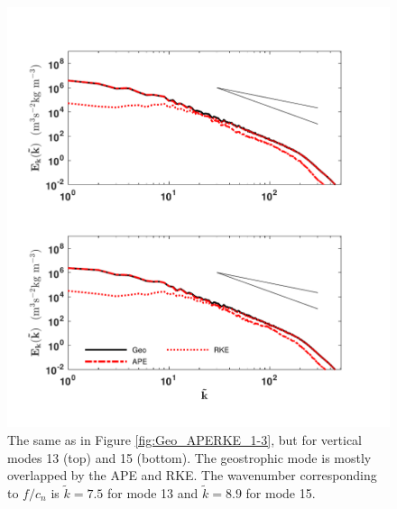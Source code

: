 \begin{figure}[H]
\includegraphics[scale=1]{Chapter4/img/Geo_APERKE_13-15}
\caption{The same as in Figure \ref{fig:Geo_APERKE_1-3}, but for vertical modes 13 (top) and 15 (bottom). The geostrophic mode is mostly overlapped by the APE and RKE. The wavenumber corresponding to $f/c_n$ is $\tilde{k} = 7.5$ for mode 13 and $\tilde{k} = 8.9$ for mode 15.}
\label{fig:Geo_APERKE_13-15}
\end{figure}

